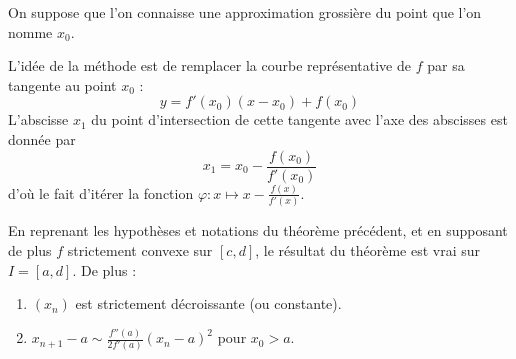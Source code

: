   \begin{remark}
    On suppose que l'on connaisse une approximation grossière du point que l'on nomme $x_0$.
    \begin{center}
    \end{center}
    L'idée de la méthode est de remplacer la courbe représentative de $f$ par sa tangente au point $x_0$ :
    \[ y = f'(x_0)(x-x_0) + f(x_0) \]
    L'abscisse $x_1$ du point d'intersection de cette tangente avec l'axe des abscisses est donnée par
    \[ x_1 = x_0 - \frac{f(x_0)}{f'(x_0)} \]
    d'où le fait d'itérer la fonction $\varphi : x \mapsto x - \frac{f(x)}{f'(x)}$.
  \end{remark}


  \begin{corollary}
    En reprenant les hypothèses et notations du théorème précédent, et en supposant de plus $f$ strictement convexe sur $[c, d]$, le résultat du théorème est vrai sur $I = [a, d]$. De plus :
    \begin{enumerate}[label={\bfseries(\roman*)}]
      \item $(x_n)$ est strictement décroissante (ou constante).
      \item $x_{n+1} - a \sim \frac{f''(a)}{2f'(a)} (x_n - a)^2$ pour $x_0 > a$.
    \end{enumerate}
  \end{corollary}

